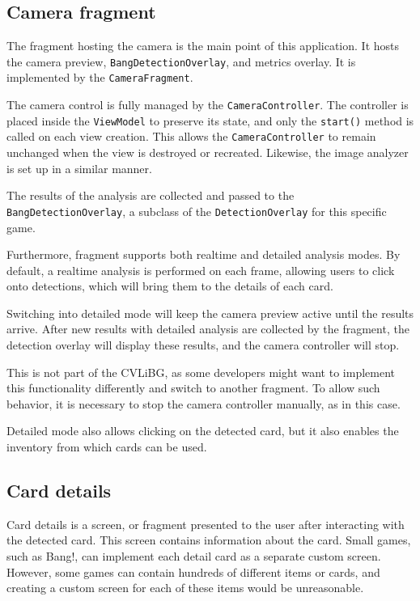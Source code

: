\subsection{Camera fragment}
The fragment hosting the camera is the main point of this application. It hosts the camera preview, \texttt{BangDetectionOverlay}, and metrics overlay. It is implemented by the \texttt{CameraFragment}.

The camera control is fully managed by the \texttt{CameraController}. The controller is placed inside the \texttt{ViewModel} to preserve its state, and only the \texttt{start()} method is called on each view creation. This allows the \texttt{CameraController} to remain unchanged when the view is destroyed or recreated. Likewise, the image analyzer is set up in a similar manner.

The results of the analysis are collected and passed to the \texttt{BangDetectionOverlay}, a subclass of the \texttt{DetectionOverlay} for this specific game.

Furthermore, fragment supports both realtime and detailed analysis modes. By default, a realtime analysis is performed on each frame, allowing users to click onto detections, which will bring them to the details of each card. 

Switching into detailed mode will keep the camera preview active until the results arrive. After new results with detailed analysis are collected by the fragment, the detection overlay will display these results, and the camera controller will stop.

This is not part of the CVLiBG, as some developers might want to implement this functionality differently and switch to another fragment. To allow such behavior, it is necessary to stop the camera controller manually, as in this case.

Detailed mode also allows clicking on the detected card, but it also enables the inventory from which cards can be used.



\subsection{Card details}
\label{DetailsFragment}
Card details is a screen, or fragment presented to the user after interacting with the detected card. This screen contains information about the card. Small games, such as Bang!, can implement each detail card as a separate custom screen. However, some games can contain hundreds of different items or cards, and creating a custom screen for each of these items would be unreasonable.

